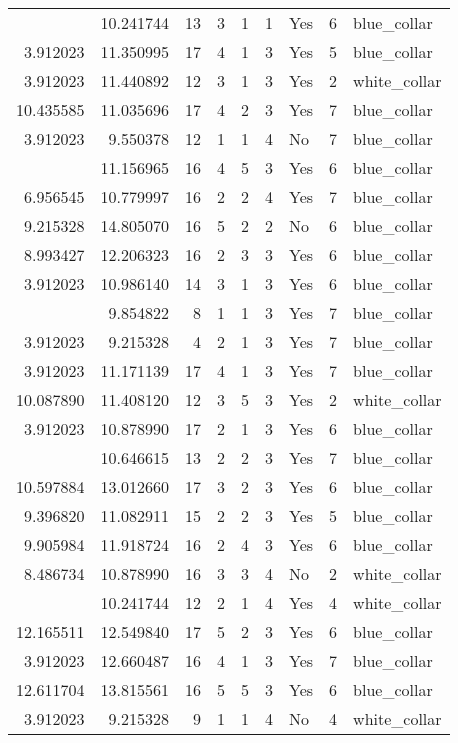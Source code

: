 \documentclass[
]{article}
\begin{document}
\begin{longtable}[t]{rrrrrllrl}
\addlinespace
3.912023 & 10.241744 & 13 & 3 & 1 & 1 & Yes & 6 & blue\_collar\\
3.912023 & 11.350995 & 17 & 4 & 1 & 3 & Yes & 5 & blue\_collar\\
3.912023 & 11.440892 & 12 & 3 & 1 & 3 & Yes & 2 & white\_collar\\
10.435585 & 11.035696 & 17 & 4 & 2 & 3 & Yes & 7 & blue\_collar\\
3.912023 & 9.550378 & 12 & 1 & 1 & 4 & No & 7 & blue\_collar\\
\addlinespace
8.656955 & 11.156965 & 16 & 4 & 5 & 3 & Yes & 6 & blue\_collar\\
6.956545 & 10.779997 & 16 & 2 & 2 & 4 & Yes & 7 & blue\_collar\\
9.215328 & 14.805070 & 16 & 5 & 2 & 2 & No & 6 & blue\_collar\\
8.993427 & 12.206323 & 16 & 2 & 3 & 3 & Yes & 6 & blue\_collar\\
3.912023 & 10.986140 & 14 & 3 & 1 & 3 & Yes & 6 & blue\_collar\\
\addlinespace
3.912023 & 9.854822 & 8 & 1 & 1 & 3 & Yes & 7 & blue\_collar\\
3.912023 & 9.215328 & 4 & 2 & 1 & 3 & Yes & 7 & blue\_collar\\
3.912023 & 11.171139 & 17 & 4 & 1 & 3 & Yes & 7 & blue\_collar\\
10.087890 & 11.408120 & 12 & 3 & 5 & 3 & Yes & 2 & white\_collar\\
3.912023 & 10.878990 & 17 & 2 & 1 & 3 & Yes & 6 & blue\_collar\\
\addlinespace
11.918724 & 10.646615 & 13 & 2 & 2 & 3 & Yes & 7 & blue\_collar\\
10.597884 & 13.012660 & 17 & 3 & 2 & 3 & Yes & 6 & blue\_collar\\
9.396820 & 11.082911 & 15 & 2 & 2 & 3 & Yes & 5 & blue\_collar\\
9.905984 & 11.918724 & 16 & 2 & 4 & 3 & Yes & 6 & blue\_collar\\
8.486734 & 10.878990 & 16 & 3 & 3 & 4 & No & 2 & white\_collar\\
\addlinespace
3.912023 & 10.241744 & 12 & 2 & 1 & 4 & Yes & 4 & white\_collar\\
12.165511 & 12.549840 & 17 & 5 & 2 & 3 & Yes & 6 & blue\_collar\\
3.912023 & 12.660487 & 16 & 4 & 1 & 3 & Yes & 7 & blue\_collar\\
12.611704 & 13.815561 & 16 & 5 & 5 & 3 & Yes & 6 & blue\_collar\\
3.912023 & 9.215328 & 9 & 1 & 1 & 4 & No & 4 & white\_collar\\

\end{longtable}
\end{document}
